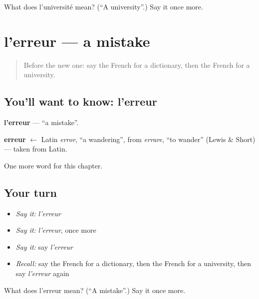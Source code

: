 \begin{tcolorbox}[breakable,colback=teal!4,colframe=teal!35!black,title={Before you move on}]
What does l'université mean? (\textquotedblleft{}A university\textquotedblright{}.) Say it once more.
\end{tcolorbox}
\section[l'erreur]{l'erreur — a mistake}

\label{lesson:FR-C232-erreur}



\begin{quote}
Before the new one: say the French for a dictionary, then the French for a university.
\end{quote}

\subsection*{You'll want to know: l'erreur}
\textbf{l'erreur} — \textquotedblleft{}a mistake\textquotedblright{}.

\begin{cousinweb}
\textbf{erreur} $\leftarrow$ Latin \emph{error}, \textquotedblleft{}a wandering\textquotedblright{}, from \emph{errare}, \textquotedblleft{}to wander\textquotedblright{} (Lewis \& Short) — taken from Latin.
\end{cousinweb}

\begin{grammarlens}[title={What you've built}]
One more word for this chapter.
\end{grammarlens}

\subsection*{Your turn}
\begin{itemize}
\raggedright
  \item \emph{Say it:} \emph{l'erreur}
  \item \emph{Say it:} \emph{l'erreur}, once more
  \item \emph{Say it:} say \emph{l'erreur}
  \item \emph{Recall:} say the French for a dictionary, then the French for a university, then say \emph{l'erreur} again
\end{itemize}

\begin{tcolorbox}[breakable,colback=teal!4,colframe=teal!35!black,title={Before you move on}]
What does l'erreur mean? (\textquotedblleft{}A mistake\textquotedblright{}.) Say it once more.
\end{tcolorbox}
